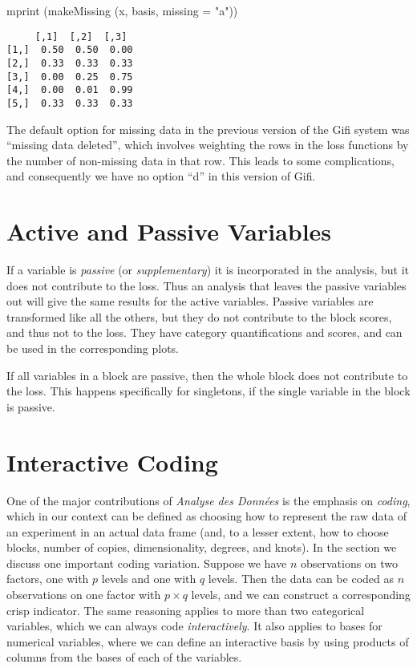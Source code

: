 \documentclass[
  12pt,
  letterpaper,
]{scrbook}
\newenvironment{Shaded}{\begin{snugshade}}{\end{snugshade}}
\newcommand{\AttributeTok}[1]{\textcolor[rgb]{0.40,0.45,0.13}{#1}}
\newcommand{\FunctionTok}[1]{\textcolor[rgb]{0.28,0.35,0.67}{#1}}
\newcommand{\NormalTok}[1]{\textcolor[rgb]{0.00,0.23,0.31}{#1}}
\newcommand{\StringTok}[1]{\textcolor[rgb]{0.13,0.47,0.30}{#1}}
\begin{document}
\begin{Shaded}
\begin{Highlighting}[]
\FunctionTok{mprint}\NormalTok{ (}\FunctionTok{makeMissing}\NormalTok{ (x, basis, }\AttributeTok{missing =} \StringTok{"a"}\NormalTok{))}
\end{Highlighting}
\end{Shaded}

\begin{verbatim}
     [,1]  [,2]  [,3] 
[1,]  0.50  0.50  0.00
[2,]  0.33  0.33  0.33
[3,]  0.00  0.25  0.75
[4,]  0.00  0.01  0.99
[5,]  0.33  0.33  0.33
\end{verbatim}

The default option for missing data in the previous version of the Gifi
system was ``missing data deleted'', which involves weighting the rows
in the loss functions by the number of non-missing data in that row.
This leads to some complications, and consequently we have no option
``d'' in this version of Gifi.

\section{Active and Passive
Variables}\label{active-and-passive-variables}

If a variable is \emph{passive} (or \emph{supplementary}) it is
incorporated in the analysis, but it does not contribute to the loss.
Thus an analysis that leaves the passive variables out will give the
same results for the active variables. Passive variables are transformed
like all the others, but they do not contribute to the block scores, and
thus not to the loss. They have category quantifications and scores, and
can be used in the corresponding plots.

If all variables in a block are passive, then the whole block does not
contribute to the loss. This happens specifically for singletons, if the
single variable in the block is passive.

\section{Interactive Coding}\label{interactive-coding}

One of the major contributions of \emph{Analyse des Données} is the
emphasis on \emph{coding}, which in our context can be defined as
choosing how to represent the raw data of an experiment in an actual
data frame (and, to a lesser extent, how to choose blocks, number of
copies, dimensionality, degrees, and knots). In the section we discuss
one important coding variation. Suppose we have \(n\) observations on
two factors, one with \(p\) levels and one with \(q\) levels. Then the
data can be coded as \(n\) observations on one factor with \(p\times q\)
levels, and we can construct a corresponding crisp indicator. The same
reasoning applies to more than two categorical variables, which we can
always code \emph{interactively}. It also applies to bases for numerical
variables, where we can define an interactive basis by using products of
columns from the bases of each of the variables.
\end{document}
